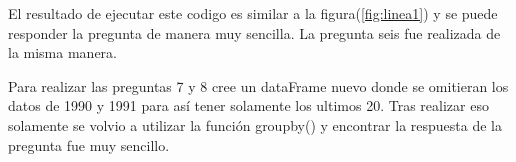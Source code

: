 \documentclass[12pt]{article}
\begin{document}
El resultado de ejecutar este codigo es similar a la figura(\ref{fig:linea1}) y se puede responder la pregunta de manera muy sencilla.
La pregunta seis fue realizada de la misma manera.

Para realizar las preguntas 7 y 8 cree un dataFrame nuevo donde se omitieran los datos de 1990 y 1991 para así tener solamente los ultimos 20.
Tras realizar eso solamente se volvio a utilizar la función groupby() y encontrar la respuesta de la pregunta fue muy sencillo.
\end{document}
